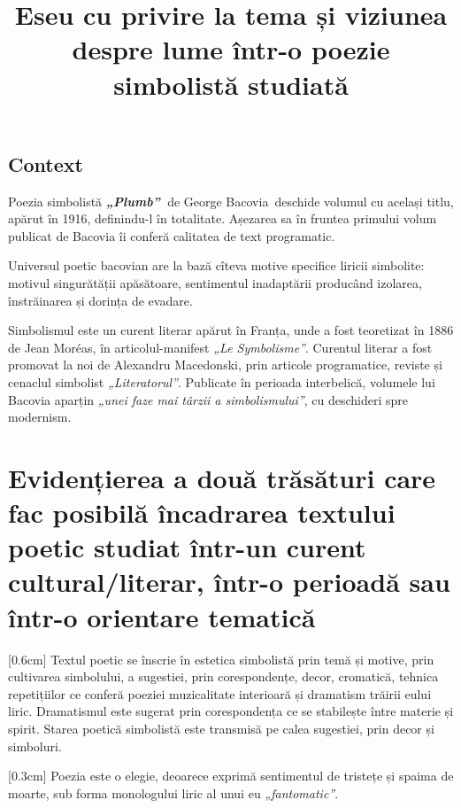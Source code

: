 \documentclass[
12pt,                        %
a4paper                      %
]{article}
\title{Eseu cu privire la tema și viziunea despre lume într-o poezie simbolistă studiată}
\date{}   %
\author{} %
\newcommand{\operatitle}{\textbf{\textit{„Plumb”\ }}} %
\newcommand{\operaauthor}{George Bacovia\ } %
\begin{document}
\maketitle %




\subsection{Context}

Poezia simbolistă \operatitle de \operaauthor deschide volumul cu același titlu, apărut în 1916, definindu-l în totalitate. Așezarea sa în fruntea primului volum publicat de Bacovia îi conferă calitatea de text programatic.

Universul poetic bacovian are la bază cîteva motive specifice liricii simbolite: motivul singurătății apăsătoare, sentimentul inadaptării producând izolarea, înstrăinarea și dorința de evadare.

Simbolismul este un curent literar apărut în Franța, unde a fost teoretizat în 1886 de Jean Moréas, în articolul-manifest \textit{„Le Symbolisme”}. Curentul literar a fost promovat la noi de Alexandru Macedonski, prin articole programatice, reviste și cenaclul simbolist \textit{„Literatorul”}. Publicate în perioada interbelică, volumele lui Bacovia aparțin \textit{„unei faze mai târzii a simbolismului”}, cu deschideri spre modernism.

\section{Evidențierea a două trăsături care fac posibilă încadrarea textului poetic studiat într-un curent cultural/literar, într-o perioadă sau într-o orientare tematică}

[0.6cm]
Textul poetic se înscrie în estetica simbolistă prin temă și motive, prin cultivarea simbolului, a sugestiei, prin corespondențe, decor, cromatică, tehnica repetițiilor ce conferă poeziei muzicalitate interioară și dramatism trăirii eului liric. Dramatismul este sugerat prin corespondența ce se stabilește între materie și spirit. Starea poetică simbolistă este transmisă pe calea sugestiei, prin decor și simboluri.

[0.3cm]
Poezia este o elegie, deoarece exprimă sentimentul de tristețe și spaima de moarte, sub forma monologului liric al unui eu \textit{„fantomatic”}.
\end{document}
